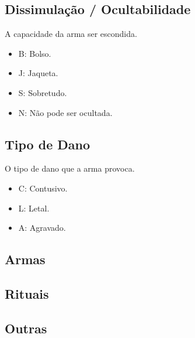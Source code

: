 

\begin{multicols}{2}

\subsection{Dissimulação / Ocultabilidade}
A capacidade da arma ser escondida.
\begin{itemize}[noitemsep]
\item B: Bolso.
\item J: Jaqueta. 
\item S: Sobretudo.
\item N: Não pode ser ocultada.
\end{itemize}

\subsection{Tipo de Dano}
O tipo de dano que a arma provoca.
\begin{itemize}[noitemsep]
\item C: Contusivo.
\item L: Letal. 
\item A: Agravado.
\end{itemize}

\end{multicols}

\subsection{Armas}

\newpage


\newpage

%

\subsection{Rituais}

\newpage

\subsection{Outras}
%

\newpage
